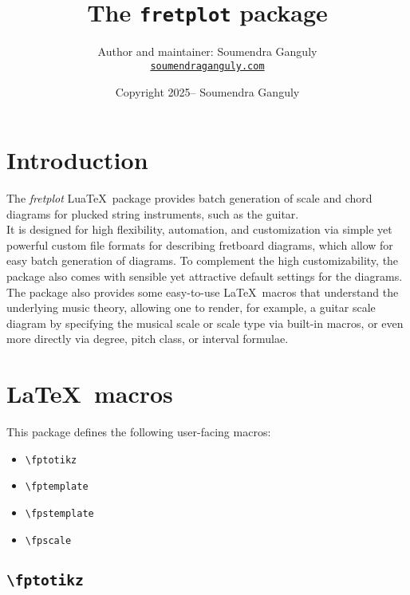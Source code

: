 \documentclass[12pt,letterpaper]{article}
\title{The \texttt{fretplot} package}
\author{Author and maintainer: Soumendra Ganguly\\\href{https://soumendraganguly.com}{\texttt{soumendraganguly.com}}}
\date{Copyright 2025-- Soumendra Ganguly}
\begin{document}
\maketitle
\thispagestyle{empty}
\tableofcontents

\newpage

\section{Introduction}

The \textit{fretplot} Lua\TeX\ package provides batch generation of scale and chord diagrams for plucked string instruments, such as the guitar.\\

It is designed for high flexibility, automation, and customization via simple yet powerful custom file formats for describing fretboard diagrams, which allow for easy batch generation of diagrams. To complement the high customizability, the package also comes with sensible yet attractive default settings for the diagrams.\\

The package also provides some easy-to-use \LaTeX\ macros that understand the underlying music theory, allowing one to render, for example, a guitar scale diagram by specifying the musical scale or scale type via built-in macros, or even more directly via degree, pitch class, or interval formulae.

\newpage

\section{\LaTeX\ macros}

This package defines the following user-facing macros:

\begin{itemize}
  \item \verb|\fptotikz|
  \item \verb|\fptemplate|
  \item \verb|\fpstemplate|
  \item \verb|\fpscale|
\end{itemize}

\subsection{\texttt{\textbackslash fptotikz}}
\end{document}
